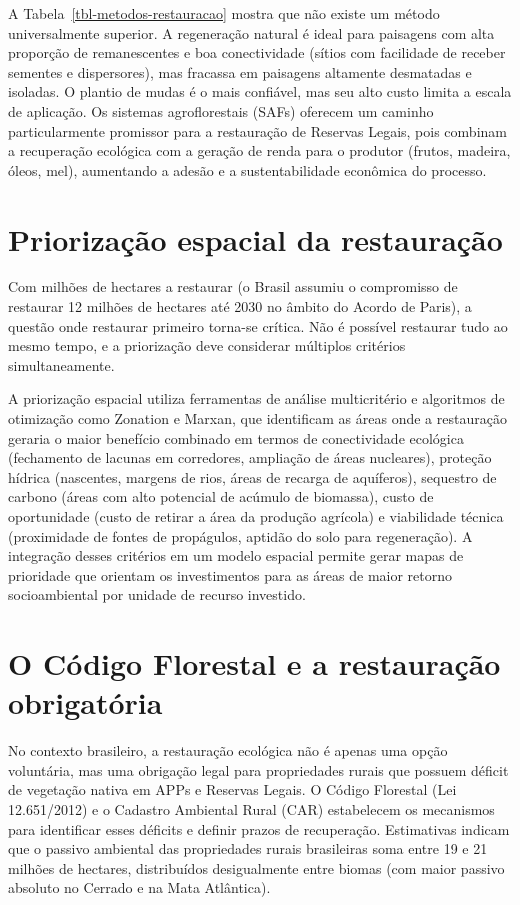 \documentclass[
  portuguese,
  11pt,
  a4paper,
  open=any]{scrbook}
\begin{document}
A Tabela~\ref{tbl-metodos-restauracao} mostra que não existe um método
universalmente superior. A regeneração natural é ideal para paisagens
com alta proporção de remanescentes e boa conectividade (sítios com
facilidade de receber sementes e dispersores), mas fracassa em paisagens
altamente desmatadas e isoladas. O plantio de mudas é o mais confiável,
mas seu alto custo limita a escala de aplicação. Os sistemas
agroflorestais (SAFs) oferecem um caminho particularmente promissor para
a restauração de Reservas Legais, pois combinam a recuperação ecológica
com a geração de renda para o produtor (frutos, madeira, óleos, mel),
aumentando a adesão e a sustentabilidade econômica do processo.

\section{Priorização espacial da
restauração}\label{priorizauxe7uxe3o-espacial-da-restaurauxe7uxe3o}

Com milhões de hectares a restaurar (o Brasil assumiu o compromisso de
restaurar 12 milhões de hectares até 2030 no âmbito do Acordo de Paris),
a questão onde restaurar primeiro torna-se crítica. Não é possível
restaurar tudo ao mesmo tempo, e a priorização deve considerar múltiplos
critérios simultaneamente.

A priorização espacial utiliza ferramentas de análise multicritério e
algoritmos de otimização como Zonation e Marxan, que identificam as
áreas onde a restauração geraria o maior benefício combinado em termos
de conectividade ecológica (fechamento de lacunas em corredores,
ampliação de áreas nucleares), proteção hídrica (nascentes, margens de
rios, áreas de recarga de aquíferos), sequestro de carbono (áreas com
alto potencial de acúmulo de biomassa), custo de oportunidade (custo de
retirar a área da produção agrícola) e viabilidade técnica (proximidade
de fontes de propágulos, aptidão do solo para regeneração). A integração
desses critérios em um modelo espacial permite gerar mapas de prioridade
que orientam os investimentos para as áreas de maior retorno
socioambiental por unidade de recurso investido.

\section{O Código Florestal e a restauração
obrigatória}\label{o-cuxf3digo-florestal-e-a-restaurauxe7uxe3o-obrigatuxf3ria}

No contexto brasileiro, a restauração ecológica não é apenas uma opção
voluntária, mas uma obrigação legal para propriedades rurais que possuem
déficit de vegetação nativa em APPs e Reservas Legais. O Código
Florestal (Lei 12.651/2012) e o Cadastro Ambiental Rural (CAR)
estabelecem os mecanismos para identificar esses déficits e definir
prazos de recuperação. Estimativas indicam que o passivo ambiental das
propriedades rurais brasileiras soma entre 19 e 21 milhões de hectares,
distribuídos desigualmente entre biomas (com maior passivo absoluto no
Cerrado e na Mata Atlântica).
\end{document}
